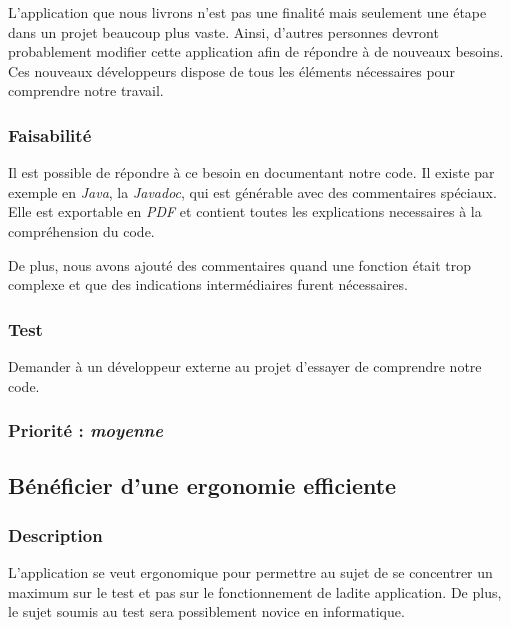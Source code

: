 L’application que nous livrons n’est pas une finalité mais seulement une étape dans un projet beaucoup plus vaste. Ainsi, d’autres personnes devront probablement modifier cette application afin de répondre à de nouveaux besoins. Ces nouveaux développeurs dispose de tous les éléments nécessaires pour comprendre notre travail.                                                                                                                                                                                                                                                                                       
\subsubsection{Faisabilité}

Il est possible de répondre à ce besoin en documentant notre code. Il existe par exemple en \textit{Java}, la \textit{Javadoc}, qui est générable avec des commentaires spéciaux. Elle est exportable en \textit{PDF} et contient toutes les explications necessaires à la compréhension du code. 

De plus, nous avons ajouté des commentaires quand une fonction était trop complexe et que des indications intermédiaires furent nécessaires.

\subsubsection{Test}

Demander à un développeur externe au projet d’essayer de comprendre notre code.

\subsubsection{Priorité : \textit{moyenne}}

\subsection{Bénéficier d’une ergonomie efficiente}

\subsubsection{Description}

L’application se veut ergonomique pour permettre au sujet de se concentrer un maximum sur le test et pas sur le fonctionnement de ladite application. De plus, le sujet soumis au test sera possiblement novice en informatique.

